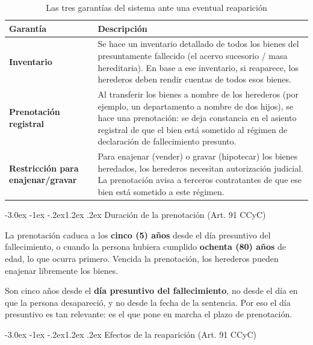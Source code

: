\documentclass[12pt,oneside]{book}
\makeatletter
\renewcommand\section{\@startsection{section}{1}{\z@}%
  {-3.0ex \@plus -1ex \@minus -.2ex}{1.2ex \@plus .2ex}%
  {\normalfont\large\bfseries\color{acento}}}
\makeatother
\begin{document}
\begin{table}[H]
\centering
\begin{tabularx}{\textwidth}{>{\raggedright\arraybackslash}p{} >{\raggedright\arraybackslash}X}
\toprule
\textbf{Garantía} & \textbf{Descripción} \\
\midrule
\textbf{Inventario} & Se hace un inventario detallado de todos los bienes del presuntamente fallecido (el acervo sucesorio / masa hereditaria). En base a ese inventario, si reaparece, los herederos deben rendir cuentas de todos esos bienes. \\
\textbf{Prenotación registral} & Al transferir los bienes a nombre de los herederos (por ejemplo, un departamento a nombre de dos hijos), se hace una prenotación: se deja constancia en el asiento registral de que el bien está sometido al régimen de declaración de fallecimiento presunto. \\
\textbf{Restricción para enajenar/gravar} & Para enajenar (vender) o gravar (hipotecar) los bienes heredados, los herederos necesitan autorización judicial. La prenotación avisa a terceros contratantes de que ese bien está sometido a este régimen. \\
\bottomrule
\end{tabularx}
\caption{Las tres garantías del sistema ante una eventual reaparición}
\end{table}

\section{Duración de la prenotación (Art. 91 CCyC)}

\begin{regla}
La prenotación caduca a los \textbf{cinco (5) años} desde el día
presuntivo del fallecimiento, o cuando la persona hubiera cumplido
\textbf{ochenta (80) años} de edad, lo que ocurra primero. Vencida la
prenotación, los herederos pueden enajenar libremente los bienes.
\end{regla}

\begin{importante}
Son cinco años desde el \textbf{día presuntivo del fallecimiento}, no
desde el día en que la persona desapareció, y no desde la fecha de la
sentencia. Por eso el día presuntivo es tan relevante: es el que pone en
marcha el plazo de prenotación.
\end{importante}

\section{Efectos de la reaparición (Art. 91 CCyC)}
\end{document}
